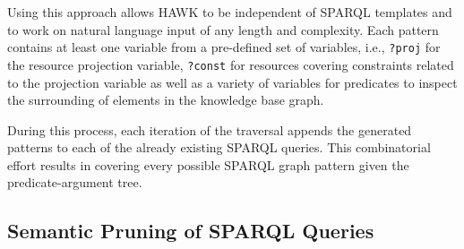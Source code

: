 Using this approach allows HAWK to be independent of SPARQL templates %
and to work on natural language input of any length and complexity.
Each pattern contains at least one variable from a pre-defined set of variables, i.e., \texttt{?proj} for the resource projection variable, \texttt{?const} for resources covering constraints related to the projection variable as well as a variety of variables for predicates to inspect the surrounding of elements in the knowledge base graph. 



During this process, each iteration of the traversal appends the generated patterns to each of the already existing SPARQL queries. 
This combinatorial effort results in covering every possible SPARQL graph pattern given the predicate-argument tree.



\subsection{Semantic Pruning of SPARQL Queries}

